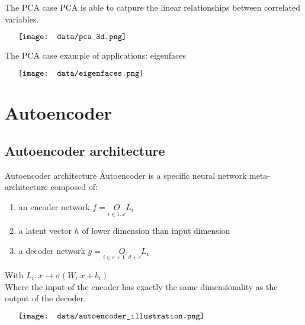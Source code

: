 \documentclass{beamer}
\begin{document}
\begin{frame}{The PCA case}
    PCA is able to catpure the linear relationships between correlated variables. \\
    \begin{minipage}{6in}
    \centering
    $\vcenter{
    \texttt{[image: data/pca\_3d.png]}
    }$
    \end{minipage}
\end{frame}

\begin{frame}{The PCA case}
    example of applications: eigenfaces \\
    \begin{minipage}{6in}
    \centering
    $\vcenter{
    \texttt{[image: data/eigenfaces.png]}
    }$
    \end{minipage}
\end{frame}


\section{Autoencoder}
\subsection{Autoencoder architecture}
\begin{frame}{Autoencoder architecture}
    Autoencoder is a specific neural network meta-architecture composed of:
    \begin{enumerate}
	\item an encoder network $f = \underset{i \in {{1 .. e}}}{O} L_i$
        \item a latent vector $h$ of lower dimension than input dimension 
	\item a decoder network $g = \underset{i \in {{e + 1 .. d + e}}}{O} L_i$
    \end{enumerate}
    With $L_i : x \rightarrow \sigma(W_i.x + b_i)$ \\
    Where the input of the encoder has exactly the same dimensionality as the output of the decoder. \\
    \begin{minipage}{6in}
    \centering
    $\vcenter{
    \texttt{[image: data/autoencoder\_illustration.png]}
    }$
    \end{minipage}
\end{frame}
\end{document}
